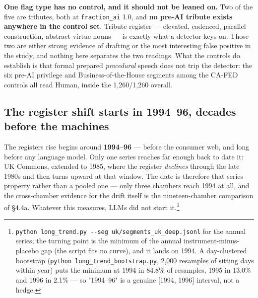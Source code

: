 \textbf{One flag type has no control, and it should not be leaned on.} Two of the
five are tributes, both at \texttt{fraction\_ai} 1.0, and \textbf{no pre-AI tribute exists
anywhere in the control set}. Tribute register --- elevated, cadenced, parallel
construction, abstract virtue nouns --- is exactly what a detector keys on. Those
two are either strong evidence of drafting or the most interesting false
positive in the study, and nothing here separates the two readings. What the
controls do establish is that formal prepared \emph{procedural} speech does not trip
the detector: the six pre-AI privilege and Business-of-the-House segments among
the CA-FED controls all read Human, inside the 1,260/1,260 overall.

\subsection{The register shift starts in 1994--96, decades before the machines}\label{sec:register-shift}

The register\textquotesingle s rise begins around \textbf{1994--96} --- before the consumer web,
and long before any language model. Only one series reaches far enough back
to date it: UK Commons, extended to 1985, where the register \emph{declines}
through the late 1980s and then turns upward at that window. The date is
therefore that series\textquotesingle{} property rather than a pooled one --- only three
chambers reach 1994 at all, and the cross-chamber evidence for the drift
itself is the nineteen-chamber comparison of §4.4a. Whatever this measures,
LLMs did not start it.\footnote{\texttt{python\ long\_\allowbreak{}trend.\allowbreak{}py\ -\allowbreak{}\/\allowbreak{}-\allowbreak{}seg\ uk/\allowbreak{}segments\_\allowbreak{}uk\_\allowbreak{}deep.\allowbreak{}jsonl} for the annual
  series; the turning point is the minimum of the annual
  instrument-minus-placebo gap (the script fits no curve), and it lands on
  1994. A day-clustered bootstrap (\texttt{python\ long\_\allowbreak{}trend\_\allowbreak{}bootstrap.\allowbreak{}py}, 2,000
  resamples of sitting days within year) puts the minimum at 1994 in 84.8\% of
  resamples, 1995 in 13.0\% and 1996 in 2.1\% --- so "1994--96" is a genuine
  {[}1994, 1996{]} interval, not a hedge.}

